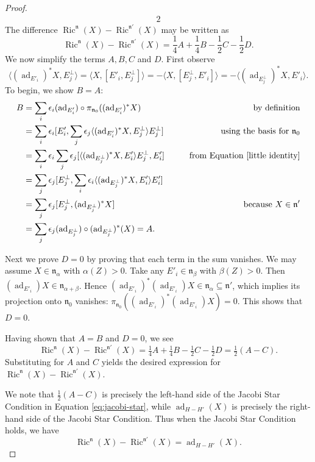 \documentclass[10pt,a4paper]{amsart}
\newcommand\ad{\operatorname{ad}}
\newcommand\n{{\mathfrak{n}}}
\newcommand{\Ric}{\operatorname{Ric}}
\newcommand{\frakn}{\ensuremath{\mathfrak{n}} }
\newcommand{\smallfrac}[2]{\textstyle{\frac{#1}{#2}}  }
\begin{document}
\begin{proof}
\begin{alignat}{2}
\end{alignat}
The difference  $\Ric^{\n} (X) - \Ric^{\n'} (X) $ may  be written as 
\[ \Ric^{\n} (X) - \Ric^{\n'} (X)  = \smallfrac 14 A + \smallfrac 14  B - \smallfrac 12 C -\smallfrac 12 D. \]
We now simplify the terms $A, B, C$ and  $D$.  
First observe  
\begin{equation}\label{little identity} \langle (\ad_{E'_i})^*X, E_j^\perp \rangle = \langle X, [E'_i,
E_j^\perp] \rangle = -\langle X, [E_j^\perp , E'_i] \rangle = -\langle
(\ad_{E_j^\perp})^* X, E'_i \rangle.\end{equation}  
To begin, we show $B = A$: 
\begin{alignat*}{2}
 B &= \sum_i \epsilon_i  (\ad_{E'_i}) \circ \pi_{\n_0} ((\ad_{E'_i})^* X) \qquad &
  \text{by definition}\\ 
& = 
\sum_i\epsilon_i  [ E'_i, \sum_j \epsilon_j \langle (\ad_{E'_i})^* X, E_j^\perp \rangle
E_j^\perp] \qquad &  \strut \text{using the basis for $\frakn_0$}  \\
&=  \sum_i \epsilon_i  \sum_j \epsilon_j [ \langle (\ad_{E_j^\perp})^* X, E'_i \rangle
E_j^\perp, E'_i ] 
& \text{from Equation \eqref{little identity}}\\
&= \sum_j \epsilon_j [ E_j^\perp , \sum_i \epsilon_i \langle (\ad_{E_j^\perp})^* X,
E'_i\rangle E'_i]  &  \\
& = \sum_j \epsilon_j [E_j^\perp, (\ad_{E_j^\perp})^* X] & 
\text{because $X \in \frakn'$}\\ 
&= \sum_j \epsilon_j  (\ad_{E_j^\perp}) \circ  (\ad_{E_j^\perp})^* (X) 
= A. & \end{alignat*}

Next we prove $D=0$ by proving that each term in the sum vanishes.
We may assume $X \in \n_{\alpha}$ with $\alpha(Z) > 0$.  Take any $E'_i \in \n_{\beta}$ with $\beta(Z) > 0$. Then  $(\ad_{E'_i}) X \in \n_{\alpha + \beta}$. Hence $(\ad_{E'_i})^* (\ad_{E'_i}) X \in
\n_{\alpha} \subseteq \n'$, which implies its projection onto $\n_0$ vanishes: $\pi_{\n_0}((\ad_{E'_i})^* (\ad_{E'_i}) X) =0$. This shows that $D=0$.

Having shown that $A=B$ and $D=0$,  we see 
\[ \Ric^{\n} (X) - \Ric^{\n'} (X)  = \tfrac 14 A + \tfrac 14  B - \tfrac 12 C -\tfrac 12 D  = \tfrac 12 (A -  C).
\]
Substituting for $A$ and $C$ yields  the desired expression for $\Ric^{\n} (X) - \Ric^{\n'} (X) $.

We note that $\tfrac 12 (A -  C)$ is precisely the left-hand side of the Jacobi Star Condition in Equation \eqref{eq:jacobi-star}, while $\ad_{H-H'}(X)$ is precisely the right-hand side of the Jacobi Star Condition. Thus when the Jacobi Star Condition holds, we have
\[ \Ric^{\n} (X) - \Ric^{\n'} (X)  =  \ad_{H-H'}(X). 
\]
\end{proof}
\end{document}
